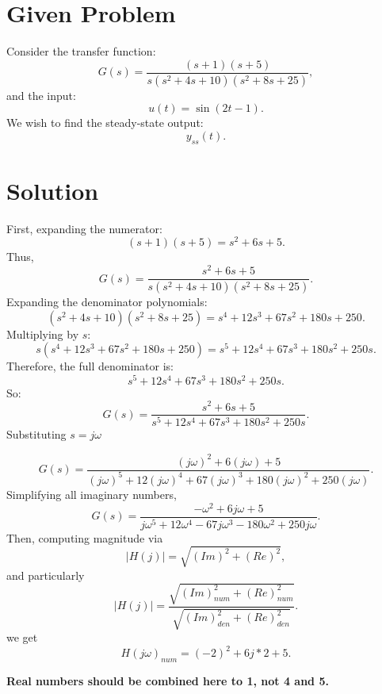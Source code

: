 \documentclass[12pt]{article}
\begin{document}
\section*{Given Problem}
Consider the transfer function:
\begin{equation}
G(s) = \frac{(s+1)(s+5)}{s(s^2 +4s +10)(s^2 +8s +25)},
\end{equation}
and the input:
\begin{equation}
u(t) = \sin(2t -1).
\end{equation}
We wish to find the steady-state output:
\begin{equation}
y_{ss}(t).
\end{equation}

\section*{Solution}

First, expanding the numerator:
\begin{equation}
(s+1)(s+5) = s^2 + 6s +5.
\end{equation}
Thus,
\begin{equation}
G(s) = \frac{s^2 +6s +5}{s(s^2 +4s +10)(s^2 +8s +25)}.
\end{equation}
Expanding the denominator polynomials:
\begin{equation}
(s^2 +4s +10)(s^2 +8s +25) = s^4 +12s^3 +67s^2 +180s +250.
\end{equation}
Multiplying by $s$:
\begin{equation}
s(s^4 +12s^3 +67s^2 +180s +250) = s^5 +12s^4 +67s^3 +180s^2 +250s.
\end{equation}
Therefore, the full denominator is:
\begin{equation}
s^5 +12s^4 +67s^3 +180s^2 +250s.
\end{equation}
So:
\begin{equation}
G(s) = \frac{s^2 +6s +5}{s^5 +12s^4 +67s^3 +180s^2 +250s}.
\end{equation}
Substituting $s = j\omega$

\begin{equation}
G(s) = \frac{(j\omega)^2 +6(j\omega) +5}{(j\omega)^5 +12(j\omega)^4 +67(j\omega)^3 +180(j\omega)^2 +250(j\omega)}.
\end{equation}
Simplifying all imaginary numbers,
\begin{equation}
G(s) = \frac{-\omega^2 +6j\omega +5}{j\omega^5 +12\omega^4 -67j\omega^3 -180\omega^2 +250j\omega}.
\end{equation}
Then, computing magnitude via
\begin{equation}
|H(j)| = \sqrt{(Im)^2+(Re)^2},
\end{equation}
and particularly
\begin{equation}
|H(j)| = \frac{\sqrt{(Im)_{num}^2+(Re)_{num}^2}}{\sqrt{(Im)_{den}^2+(Re)_{den}^2}}.
\end{equation}
we get
\begin{equation}
H(j\omega)_{num} = (-2)^2 +6j*2 +5.
\end{equation}
\begin{flushright}\color{red}\scriptsize \textbf{Real numbers should be combined here to 1, not 4 and 5.}\end{flushright}
\end{document}
